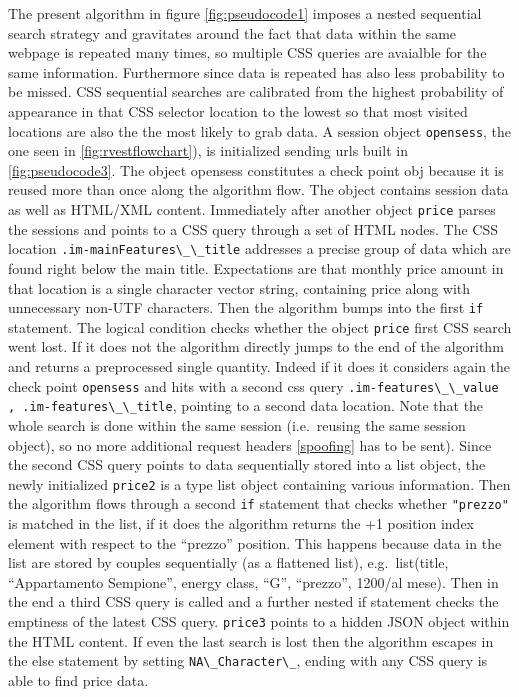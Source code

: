 \documentclass[
  12pt,
  a4paper,
  oneside]{book}
\newcommand{\passthrough}[1]{#1}
\theoremstyle{definition}
\theoremstyle{definition}
\theoremstyle{definition}
\theoremstyle{remark}
\begin{document}
The present algorithm in figure \ref{fig:pseudocode1} imposes a nested sequential search strategy and gravitates around the fact that data within the same webpage is repeated many times, so multiple CSS queries are avaialble for the same information. Furthermore since data is repeated has also less probability to be missed. CSS sequential searches are calibrated from the highest probability of appearance in that CSS selector location to the lowest so that most visited locations are also the the most likely to grab data.
A session object \passthrough{\lstinline!opensess!}, the one seen in \ref{fig:rvestflowchart}), is initialized sending urls built in \ref{fig:pseudocode3}. The object opensess constitutes a check point obj because it is reused more than once along the algorithm flow. The object contains session data as well as HTML/XML content. Immediately after another object \passthrough{\lstinline!price!} parses the sessions and points to a CSS query through a set of HTML nodes. The CSS location \passthrough{\lstinline!.im-mainFeatures\_\_title!} addresses a precise group of data which are found right below the main title. Expectations are that monthly price amount in that location is a single character vector string, containing price along with unnecessary non-UTF characters. Then the algorithm bumps into the first \passthrough{\lstinline!if!} statement. The logical condition checks whether the object \passthrough{\lstinline!price!} first CSS search went lost. If it does not the algorithm directly jumps to the end of the algorithm and returns a preprocessed single quantity. Indeed if it does it considers again the check point \passthrough{\lstinline!opensess!} and hits with a second css query \passthrough{\lstinline!.im-features\_\_value , .im-features\_\_title!}, pointing to a second data location. Note that the whole search is done within the same session (i.e.~reusing the same session object), so no more additional request headers \ref{spoofing} has to be sent). Since the second CSS query points to data sequentially stored into a list object, the newly initialized \passthrough{\lstinline!price2!} is a type list object containing various information. Then the algorithm flows through a second \passthrough{\lstinline!if!} statement that checks whether \passthrough{\lstinline!"prezzo"!} is matched in the list, if it does the algorithm returns the +1 position index element with respect to the ``prezzo'' position. This happens because data in the list are stored by couples sequentially (as a flattened list), e.g.~list(title, ``Appartamento Sempione'', energy class, ``G'', ``prezzo'', 1200/al mese). Then in the end a third CSS query is called and a further nested if statement checks the emptiness of the latest CSS query. \passthrough{\lstinline!price3!} points to a hidden JSON object within the HTML content. If even the last search is lost then the algorithm escapes in the else statement by setting \passthrough{\lstinline!NA\_Character\_!}, ending with any CSS query is able to find price data.
\end{document}
